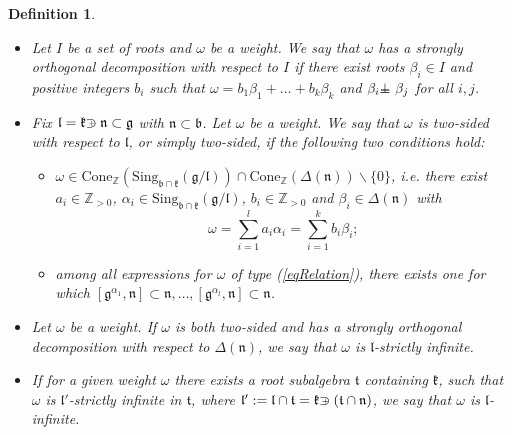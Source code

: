 \documentclass[12pt]{report}
\newtheorem{lemma}[theo]{Lemma}
\newtheorem{defi}[theo]{Definition}
\newcommand {\ZZ} {\mathbb {Z}}
\newcommand{\tT}{\mathfrak{t}}
\newcommand{\kk}{\mathfrak{k}}
\newcommand{\nn}{\mathfrak{n}}
\newcommand{\hh}{\mathfrak{h}}
\newcommand{\gG}{\mathfrak{g}}
\newcommand{\bb}{\mathfrak{b}}
\newcommand{\lL}{\mathfrak{l}}
\newcommand{\refeq}[1]{(\ref{#1})}
\newcommand{\Cone}{\mathrm{Cone}}
\newcommand{\hw}{\mathrm{Sing}}
\def\crplus{\hbox{$\supset${\raise1.05pt\hbox{\kern -0.60em ${\scriptscriptstyle +}$}}\ }}
\def\sperp{{\hbox{$\perp${\hbox{\kern -.77em $-$}\raise-1pt\hbox{\kern -.77em $-$}}\ }}}
\begin{document}
\begin{defi}\label{defStronglyPerp}\label{defKmult}~
\begin{itemize}
\item Let $I$ be a set of roots and $\omega$ be a weight. We say that $\omega$ \emph{has a strongly orthogonal decomposition with respect to $I$} if there exist roots  $\beta_i\in I$ and positive integers $b_i$ such that $\omega=b_1\beta_1+\dots +b_k\beta_k$ and $\beta_i\sperp\beta_j$ for all $i,j$. 
\item Fix $\lL=\kk\crplus\nn\subset\gG$ with $\nn\subset\bb$. Let $\omega$ be a weight. We say that $\omega$ is \emph{two-sided with respect to $\lL$}, or simply \emph{two-sided}, if the following two conditions hold:
\begin{itemize}
\item $\omega\in \Cone_{\ZZ}(\hw_{\bb\cap\kk}(\gG/\lL))\cap\Cone_{\ZZ}(\Delta(\nn))\backslash\{0\}$, i.e. there exist $a_i\in\ZZ_{>0}$, $\alpha_i \in \hw_{\bb\cap\kk} (\gG/\lL)$, $b_i\in\ZZ_{>0}$ and $\beta_i\in\Delta(\nn)$ with 
\begin{equation}\label{eqRelation}
\omega=\sum_{i=1}^la_i\alpha_i=\sum_{i=1}^k b_i\beta_i;
\end{equation}
\item among all expressions for $\omega$ of type \refeq{eqRelation}, there exists one for which $[\gG^{\alpha_1},\nn]\subset\nn,\dots, [\gG^{\alpha_l},\nn]\subset\nn$. 
\end{itemize}
\item Let $\omega$ be a weight. If $\omega$ is both two-sided and has a strongly orthogonal decomposition with respect to $\Delta(\nn)$, we say that $\omega$ is \emph{$\lL$-strictly infinite}.
\item If for a given weight $\omega$ there exists a root subalgebra $\tT$ containing $\kk$, such that $\omega$ is $\lL'$-strictly infinite in $\tT$, where $\lL':=\lL\cap\tT=\kk\crplus(\tT\cap\nn)$, we say that $\omega$ is \emph{$\lL$-infinite}.
\end{itemize}
\end{defi}


\label{secMultiplicities}

\end{document}
